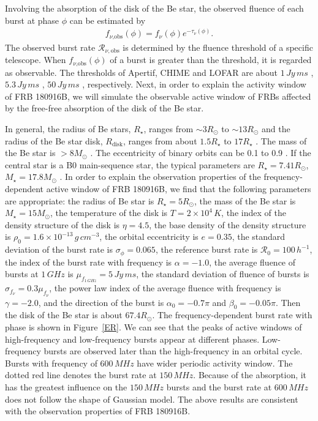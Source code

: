 \documentclass[twocolumn]{aastex62}
\begin{document}
Involving the absorption of the disk of the Be star, the observed fluence of each burst at phase $\phi$ can be estimated by
\begin{eqnarray}
f_{\text{$\nu$,obs}}(\phi) = f_{\nu}(\phi) e^{- \tau_{\nu}(\phi)}.
\end{eqnarray}
The observed burst rate $\mathcal R_{\nu,\text{obs}}$ is determined by the fluence threshold of a specific telescope. When $f_{\text{$\nu$,obs}}(\phi)$ of a burst is greater than the threshold, it is regarded as observable.
The thresholds of Apertif, CHIME and LOFAR are about $1 \,\unit{Jy\,ms}$ \citep{pas20}, $5.3 \,\unit{Jy\,ms}$ \citep{Chime/Frb2020}, $50 \,\unit{Jy\,ms}$ \citep{pas20}, respectively.
Next, in order to explain the activity window of FRB 180916B, we will simulate the observable active window of FRBs affected by the free-free absorption of the disk of the Be star.

In general, the radius of Be stars, $R_{\star}$, ranges from $\sim 3R_{\odot}$ to $\sim13R_{\odot}$ and the radius of the Be star disk, $R_{\text{disk}}$, ranges from about $1.5R_{\star}$ to $17R_{\star}$ \citep{riv13}.
The mass of the Be star is $>8M_{\odot}$ \citep{rei11}.
The eccentricity of binary orbits can be 0.1 to 0.9 \citep{zio02}.
If the central star is a B0 main-sequence star, the typical parameters are $R_{\star} = 7.41R_{\odot}$, $M_{\star} = 17.8 M_{\odot}$ \citep{all73}.
In order to explain the observation properties of the frequency-dependent active window of FRB 180916B, we find that the following parameters are appropriate: the radius of Be star is $R_{\star} = 5 R_{\odot}$, the mass of the Be star is $M_{\star} = 15 M_{\odot}$, the temperature of the disk is $T = 2\times10^4\,\unit{K}$, the index of the density structure of the disk is $\eta = 4.5$, the base density of the density structure is $\rho_0 = 1.6\times 10^{-13}\,\unit{g\,cm^{-3}}$, the orbital eccentricity is $e=0.35$, the standard deviation of the burst rate is $\sigma_{\phi} = 0.065$,  the reference burst rate is $\mathcal{R}_0 = 100\,\unit{h^{-1}}$,
the index of the burst rate with frequency is $\alpha = -1.0$,
the average fluence of bursts at $1\,\unit{GHz}$ is $\mu_{f_{1\,\unit{GHz}}} = 5 \,\unit{Jy\,ms}$,
the standard deviation of fluence of bursts is $ \sigma_{f_{\nu}} = 0.3 \mu_{f_{\nu}}$,
the power law index of the average fluence with frequency is $\gamma = -2.0$,
and the direction of the burst is $\alpha_0 = -0.7\pi$ and $\beta_0 = -0.05\pi$. Then the disk of the Be star is about $67.4R_{\odot}$. The frequency-dependent burst rate with phase is shown in Figure~\ref{ER}.
We can see that the peaks of active windows of high-frequency and low-frequency bursts appear at different phases. Low-frequency bursts are observed later than the high-frequency in an orbital cycle.
Bursts with frequency of $600\,\unit{MHz}$ have wider periodic activity window.
The dotted red line denotes the burst rate at $150\,\unit{MHz}$. Because of the absorption, it has the greatest influence on the $150\,\unit{MHz}$ bursts and the burst rate at $600\,\unit{MHz}$ does not follow the shape of Gaussian model. The above results are consistent with the observation properties of FRB 180916B.
\end{document}
